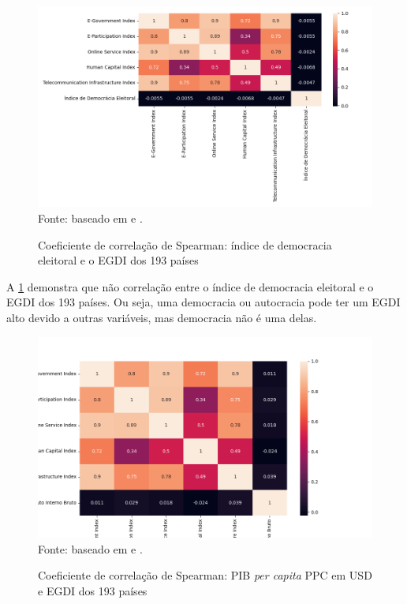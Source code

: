 \begin{figure}[H]
    \centering
    \caption{Coeficiente de correlação de Spearman: índice de democracia eleitoral e o EGDI dos 193 países}
    \includegraphics[width=1\linewidth]{figuras/egdi/correlacao3.png}
    \label{fig:correlacao3}
    \footnotesize{Fonte: baseado em \cite{ONU_edgi_mapa} e \cite{electoral_democracy_index}.}
\end{figure}

A \ref{fig:correlacao3} demonstra que não correlação entre o índice de democracia eleitoral e o EGDI dos 193 países. Ou seja, uma democracia ou autocracia pode ter um EGDI alto devido a outras variáveis, mas democracia não é uma delas.

\begin{figure}[H]
    \centering
    \caption{Coeficiente de correlação de Spearman: PIB \textit{per capita} PPC em USD e EGDI dos 193 países}
    \includegraphics[width=1\linewidth]{figuras/egdi/correlacao4.png}
    \label{fig:correlacao4}
    \footnotesize{Fonte: baseado em \cite{ONU_edgi_mapa} e \cite{WB_pib_per_capita_países}.}
\end{figure}

